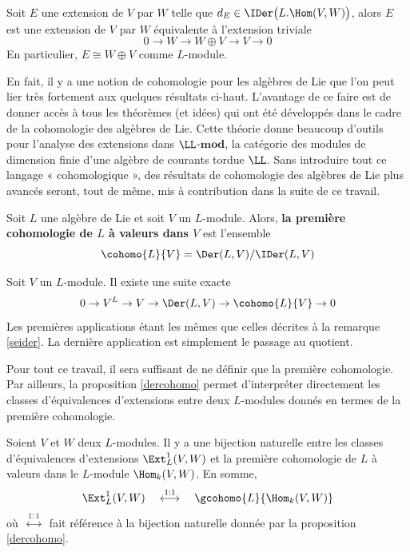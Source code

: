 \begin{Cor} \label{zeroexttriviale} Soit $E$ une extension de $V$ par $W$ telle que $d_E \in \IDer\big(L.\Hom(V,W)\big)$, alors $E$ est une extension de $V$ par $W$ équivalente à l'extension triviale
$$ 0 \rightarrow W \rightarrow W \oplus V \rightarrow V \rightarrow 0 $$ 
En particulier, $E \cong W \oplus V$ comme $L$-module.
\end{Cor}

En fait, il y a une notion de cohomologie pour les algèbres de Lie que l'on peut lier très fortement aux quelques résultats ci-haut. L'avantage de ce faire est de donner accès à tous les théorèmes (et idées) qui ont été développés dans le cadre de la cohomologie des algèbres de Lie. Cette théorie donne beaucoup d'outils pour l'analyse des extensions dans $\LL$-$\mathbf{mod}$, la catégorie des modules de dimension finie d'une algèbre de courants tordue $\LL$. Sans introduire tout ce langage « cohomologique », des résultats de cohomologie des algèbres de Lie plus avancés seront, tout de même, mis à contribution dans la suite de ce travail. 

\begin{Def} \label{1cohomo} Soit $L$ une algèbre de Lie et soit $V$ un $L$-module. Alors, \textbf{la première cohomologie de $L$ à valeurs dans $V$} est l'ensemble
\begin{equation}
\cohomo{L}{V} = \Der(L,V) / \IDer(L,V)
\end{equation}
\end{Def}

\begin{Rem} Soit $V$ un $L$-module. Il existe une suite exacte
$$ 0 \rightarrow V^L \rightarrow V \rightarrow \Der(L,V) \rightarrow \cohomo{L}{V} \rightarrow 0 $$
Les premières applications étant les mêmes que celles décrites à la remarque \ref{seider}. La dernière application est simplement le passage au quotient.
\end{Rem}


Pour tout ce travail, il sera suffisant de ne définir que la première cohomologie. Par ailleurs, la proposition \ref{dercohomo} permet d'interpréter directement les classes d'équivalences d'extensions entre deux $L$-modules donnés en termes de la première cohomologie.

\begin{Prop} \label{cohomoext} Soient $V$ et $W$ deux $L$-modules. Il y a une bijection naturelle entre les classes d'équivalences d'extensions $\Ext_L^1(V,W)$ et la première cohomologie de $L$ à valeurs dans le $L$-module $\Hom_k(V,W)$. En somme,
\begin{equation} \label{extcohomo}
\Ext_L^1(V,W) \quad \stackrel{1:1}{\longleftrightarrow} \quad \gcohomo{L}{\Hom_k(V,W)}
\end{equation}
où $\; \stackrel{1:1}{\longleftrightarrow} \;$ fait référence à la bijection naturelle donnée par la proposition \ref{dercohomo}.
\end{Prop}


